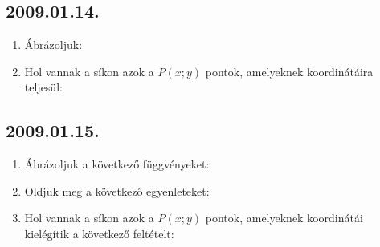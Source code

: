 \subsection*{2009.01.14.}
\begin{enumerate}
\item Ábrázoljuk:
\item Hol vannak a síkon azok a $P(x;y)$ pontok, amelyeknek koordinátáira teljesül:
\end{enumerate}


\subsection*{2009.01.15.}
\begin{enumerate}
\item Ábrázoljuk a következő függvényeket:
\item Oldjuk meg a következő egyenleteket:
\item Hol vannak a síkon azok a $P(x;y)$ pontok, amelyeknek
koordinátái kielégítik a következő feltételt:

\end{enumerate}


